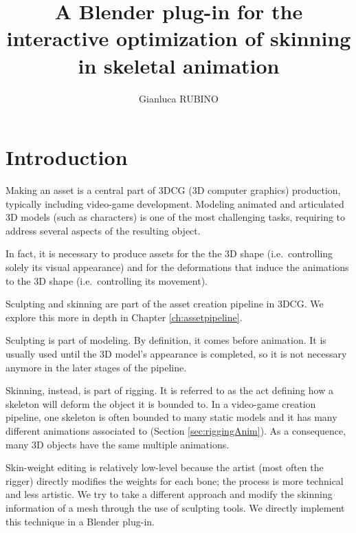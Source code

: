 \documentclass[12pt,twoside]{report}
\begin{document}
\title{A Blender plug-in for the interactive optimization of skinning in skeletal animation}
\author{Gianluca RUBINO}

\maketitle

\tableofcontents
\listoffigures
\cleardoublepage
{}

\chapter{Introduction}
\label{ch:intro}
Making an asset is a central part of  3DCG (3D computer graphics) production, typically including video-game development. Modeling animated and articulated 3D models (such as characters) is one of the most challenging tasks, requiring to address several aspects of the resulting object.

In fact, it is necessary to produce assets for the the 3D shape (i.e.\ controlling solely its visual appearance) and for the deformations that induce the animations to the 3D shape (i.e.\ controlling its movement).

Sculpting and skinning are part of the asset creation pipeline in 3DCG. We explore this more in depth in Chapter \ref{ch:assetpipeline}.

Sculpting is part of modeling. By definition, it comes before animation. It is usually used until the 3D model's appearance is completed, so it is not necessary anymore in the later stages of the pipeline.

Skinning, instead, is part of rigging. It is referred to as the act defining how a skeleton will deform the object it is bounded to. In a video-game creation pipeline, one skeleton is often bounded to many static models and it has many different animations associated to (Section \ref{sec:riggingAnim}). As a consequence, many 3D objects have the same multiple animations.

Skin-weight editing is relatively low-level because the artist (most often the rigger) directly modifies the weights for each bone; the process is more technical and less artistic. We try to take a different approach and modify the skinning information of a mesh through the use of sculpting tools. We directly implement this technique in a Blender plug-in.
\end{document}
